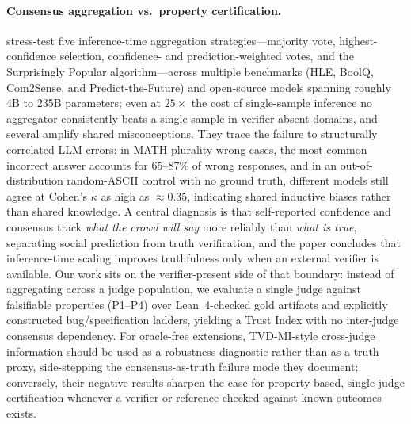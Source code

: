 \documentclass{article}
\begin{document}
\paragraph{Consensus aggregation vs.\ property certification.}
\citet{denisovblanch2026consensus} stress-test five inference-time aggregation strategies---majority vote, highest-confidence selection, confidence- and prediction-weighted votes, and the Surprisingly Popular algorithm---across multiple benchmarks (HLE, BoolQ, Com2Sense, and Predict-the-Future) and open-source models spanning roughly 4B to 235B parameters; even at $25\times$ the cost of single-sample inference no aggregator consistently beats a single sample in verifier-absent domains, and several amplify shared misconceptions.
They trace the failure to structurally correlated LLM errors: in MATH plurality-wrong cases, the most common incorrect answer accounts for 65--87\% of wrong responses, and in an out-of-distribution random-ASCII control with no ground truth, different models still agree at Cohen's $\kappa$ as high as ${\approx}0.35$, indicating shared inductive biases rather than shared knowledge.
A central diagnosis is that self-reported confidence and consensus track \emph{what the crowd will say} more reliably than \emph{what is true}, separating social prediction from truth verification, and the paper concludes that inference-time scaling improves truthfulness only when an external verifier is available.
Our work sits on the verifier-present side of that boundary: instead of aggregating across a judge population, we evaluate a single judge against falsifiable properties (P1--P4) over Lean~4-checked gold artifacts and explicitly constructed bug/specification ladders, yielding a Trust Index with no inter-judge consensus dependency.
For oracle-free extensions, TVD-MI-style cross-judge information should be used as a robustness diagnostic rather than as a truth proxy, side-stepping the consensus-as-truth failure mode they document; conversely, their negative results sharpen the case for property-based, single-judge certification whenever a verifier or reference checked against known outcomes exists.
\end{document}
